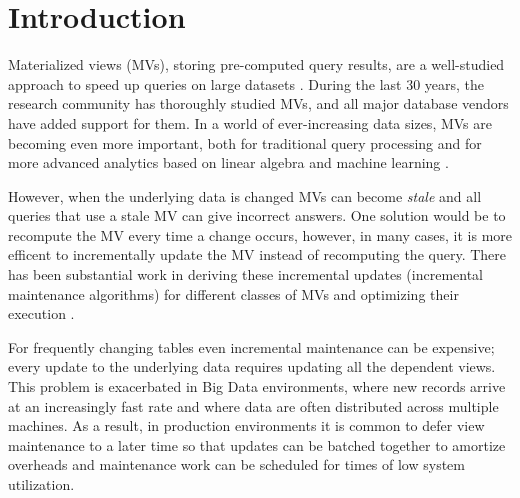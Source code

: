 \vspace{-0.5em}
\section{Introduction}
Materialized views (MVs), storing pre-computed query results, are a well-studied approach to speed up queries on large datasets \cite{LarsonY85, gupta1995maintenance, chirkova2011materialized, halevy2001answering}.
During the last 30 years, the research community has thoroughly studied MVs, and all major database vendors have added support for them.
In a world of ever-increasing data sizes, MVs are becoming even more important, both for traditional query processing
 \cite{lefevre2014opportunistic, bailis2014scalable, perez2014history} and for more advanced analytics based on linear algebra and machine learning \cite{nikolic2014linview, zhang2014mat}.

However, when the underlying data is changed MVs can become \emph{stale} and all queries that use a stale MV can give incorrect answers. 
One solution would be to recompute the MV every time a change occurs, however, in many cases, it is more efficent to incrementally update the MV instead of recomputing the query.
There has been substantial work in deriving these incremental updates (incremental maintenance algorithms) for different classes of MVs and optimizing their execution \cite{gupta1995maintenance, DBLP:conf/sigmod/GriffinL95, griffin1997improved, samtani1999self, DBLP:conf/sac/TrutaC07, DBLP:journals/vldb/KochAKNNLS14, chirkova2011materialized}.

For frequently changing tables even incremental maintenance can be expensive; every update to the underlying data requires updating all the dependent views.  
This problem is exacerbated in Big Data environments, where new records arrive at an increasingly fast rate and where data are often 
distributed across multiple machines.  
As a result, in production environments it is common to defer view maintenance to a later time \cite{chirkova2011materialized, zhou2007lazy, DBLP:conf/sigmod/ColbyGLMT96} so that updates can be batched together to amortize overheads and maintenance work can be scheduled for times of low system utilization.  


